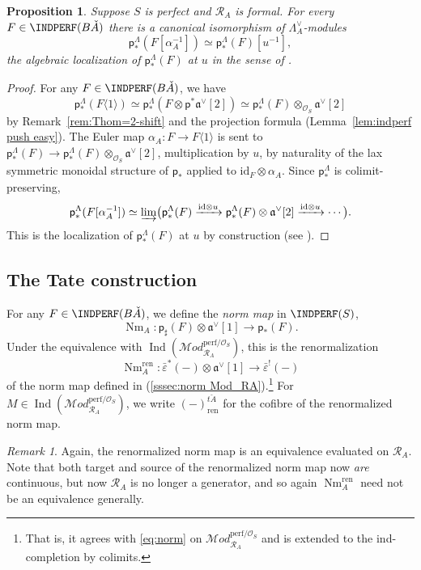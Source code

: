 \documentclass[12pt, oneside]{amsart}
\numberwithin{equation}{section}
\newtheorem{proposition}[subsubsection]{Proposition}
\theoremstyle{remark}
\newtheorem{remark}[subsubsection]{Remark}
\theoremstyle{plain}
\newcommand{\MOD}{\mathcal{M}\textit{od}}
\newcommand{\R}{\mathcal{R}}
\newcommand{\RA}{\R_A}
\newcommand{\frav}{\mathfrak{a}^\vee}
\newcommand{\lamco}{\Lambda^\vee}
\newcommand{\OO}{\mathcal{O}}
\newcommand{\Ind}{\operatorname{Ind}}
\newcommand{\id}{\mathrm{id}}
\newcommand{\Nm}{\operatorname{Nm}}
\newcommand{\Thom}[1]{\langle #1 \rangle}
\newcommand{\epsb}{\bar{\varepsilon}}
\newcommand{\sfp}{\mathsf{p}}
\begin{document}
\begin{proposition}\label{prop:Bott as localization in sqzero case}
Suppose $S$ is perfect and $\RA$ is formal.
For every $F \in \INDPERF(B\check{A})$ there is a canonical isomorphism of $\lamco_A$-modules
\[ \sfp_*^{\Lambda}(F[\alpha_A^{-1}]) \simeq \sfp_*^{\Lambda}(F)[u^{-1}], \]
the algebraic localization of $\sfp_*^{\Lambda}(F)$ at $u$ in the sense of \cite[Prop.~4.3.17]{LurieEll2}.
\end{proposition}
\begin{proof}
For any $F \in \INDPERF(B\check{A})$, we have $$\sfp_*^{\Lambda}(F\Thom{1}) \simeq \sfp_*^{\Lambda}(F \otimes \sfp^*\frav[2]) \simeq \sfp_*^{\Lambda}(F) \otimes_{\OO_S} \frav[2]$$ by Remark~\ref{rem:Thom=2-shift} and the projection formula (Lemma~\ref{lem:indperf push easy}).
The Euler map $\alpha_A : F \to F\Thom{1}$ is sent to $\sfp_*^{\Lambda}(F) \to \sfp_*^{\Lambda}(F) \otimes_{\OO_S} \frav[2]$, multiplication by $u$, by naturality of the lax symmetric monoidal structure of $\sfp_*$ applied to $\id_F \otimes \alpha_A$.
Since $\sfp_*^{\Lambda}$ is colimit-preserving,
\[
  \sfp_*^{\Lambda}(F[\alpha_A^{-1}])
  \simeq \varinjlim \bigl( \sfp_*^{\Lambda}(F) \xrightarrow{\id \otimes u} \sfp_*^{\Lambda}(F) \otimes \frav[2] \xrightarrow{\id \otimes u} \cdots \bigr).
\]
This is the localization of $\sfp_*^{\Lambda}(F)$ at $u$ by construction (see \cite[Prop.~4.3.17]{LurieEll2}).
\end{proof}

\subsection{The Tate construction}\label{ssec:Tate}

For any $F \in \INDPERF(B\check{A})$, we define the \emph{norm map} in $\INDPERF(S)$,
\begin{equation}
	\Nm_A : \sfp_\sharp(F) \otimes \frav[1] \to \sfp_*(F).
\end{equation}
Under the equivalence with $\Ind(\MOD_{\RA}^{\mathrm{perf}/\OO_S})$, this is the renormalization
\[
  \Nm_A^{\mathrm{ren}} : \epsb^*(-) \otimes \frav[1] \to \epsb^!(-)
\]
of the norm map defined in (\ref{sssec:norm Mod_RA}).\footnote{%
  That is, it agrees with \eqref{eq:norm} on $\MOD_{\RA}^{\mathrm{perf}/\OO_S}$ and is extended to the ind-completion by colimits.
}
For $M \in \Ind(\MOD_{\RA}^{\mathrm{perf}/\OO_S})$, we write $(-)^{t\check{A}}_{\mathrm{ren}}$ for the cofibre of the renormalized norm map.

\begin{remark}\label{renorm norm iso} Again, the renormalized norm map is an equivalence evaluated on $\RA$. Note that both target and source of the renormalized norm map now \emph{are} continuous, but now $\RA$ is no longer a generator, and so again $\Nm_A^{\mathrm{ren}}$ need not be an equivalence generally.\end{remark}
\end{document}
